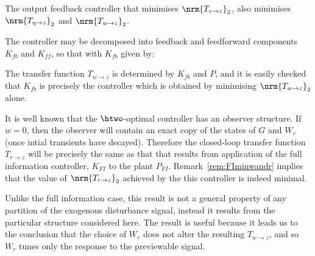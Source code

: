 \begin{cor}
\label{cor:minwandr}
The output feedback controller that minimises $\nrm{T_{v\rightarrow z}}_2$, also minimises $\nrm{T_{\eta\rightarrow z}}_2$ and $\nrm{T_{w\rightarrow z}}_2$.
\end{cor}
\begin{pf}
The controller may be decomposed into feedback and feedforward components $K_{fb}$ and $K_{ff}$, so that 
with $K_{fb}$ given by:

The transfer function $T_{w\rightarrow z}$ is determined by $K_{fb}$ and $P$, and it is  easily checked that $K_{fb}$ is precisely the controller which is obtained by minimising $\nrm{T_{w\rightarrow z}}_2$ alone.

It is well known that the $\htwo$-optimal controller has an observer structure. If $w=0$, then the observer will contain an exact copy of the states of $G$ and $W_r$ (once intial transients have decayed). Therefore the closed-loop transfer function $T_{r\rightarrow z}$ will be precisely the same as that that results from application of the full information controller, $K_{FI}$ to the plant $P_{FI}$. Remark~\ref{rem:FIminwandr} implies that the value of $\nrm{T_{r\rightarrow z}}_2$ achieved by the this controller is indeed minimal.
\end{pf}

Unlike the full information case, this result is not a general property of any partition of the exogenous disturbance signal, instead it results from the particular structure considered here. The result is useful because it leads us to the conclusion that the choice of $W_r$ does not alter the resulting  $T_{w\rightarrow z}$, and so $W_r$ tunes only the response to the previewable signal. 









